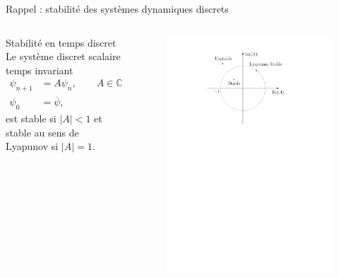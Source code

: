 \documentclass[aspectratio=169, french]{beamer}
\begin{document}
\begin{frame}{Rappel : stabilité des systèmes dynamiques discrets}
	\begin{columns}
		\begin{column}{.5\textwidth}
			\begin{block}{Stabilité en temps discret}
				Le système discret scalaire temps invariant
				\begin{equation*}
					\begin{aligned}
						\psi_{n+1} &= A \psi_n, \qquad A \in \mathbb{C}, \\
						\psi_0 &= \overline{\psi},
					\end{aligned}
				\end{equation*}  
				est stable si $|A|<1$ et stable au sens de Lyapunov si $|A|=1$.
			\end{block}
		\end{column}
		\begin{column}{.5\textwidth}
			\begin{figure}
				\centering
				\includegraphics[height=.7\textheight]{discrete_stability.pdf}
			\end{figure}
		\end{column}
	\end{columns}	
\end{frame}
\end{document}
